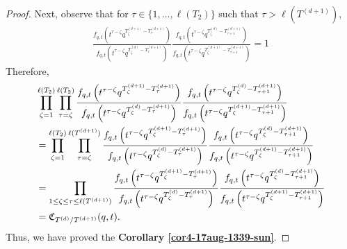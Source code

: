 \documentclass[12pt,reqno,a4paper]{amsart}
\newcommand{\fraks}[1]{\mathfrak{#1}}
\numberwithin{equation}{section}
\theoremstyle{definition}
\begin{document}
\begin{proof}
Next, observe that for $\tau \in \{1,\dots,\ell(T_2)\}$ such that $\tau > \ell(T^{(d+1)})$, 
\footnotesize
\begin{align}
	\frac{
		f_{q,t}\left(	t^{\tau - \zeta} q^{ T^{(d+1)}_{\zeta} 	- T^{(d+1)}_{\tau}	 		}						\right)
	}{
		f_{q,t}\left(	t^{\tau - \zeta} q^{ T^{(d)}_{\zeta} 	- T^{(d+1)}_{\tau}		}						\right)
	}
	\frac{
		f_{q,t}\left(		
		t^{\tau - \zeta} q^{ T^{(d)}_{\zeta} 	- T^{(d+1)}_{\tau + 1} 		}					\right)
	}{
		f_{q,t}\left(		
		t^{\tau- \zeta} q^{ T^{(d+1)}_{\zeta} 	- T^{(d+1)}_{\tau + 1}			}					\right)
	} 
	= 1
\end{align}
\normalsize
Therefore, 
\footnotesize
\begin{align}
	&\prod_{\zeta = 1}^{\ell(T_2)}
	\prod_{\tau = \zeta}^{\ell(T_2)}
	\frac{
		f_{q,t}\left(	t^{\tau - \zeta} q^{ T^{(d+1)}_{\zeta} 	- T^{(d+1)}_{\tau}	 		}						\right)
	}{
		f_{q,t}\left(	t^{\tau - \zeta} q^{ T^{(d)}_{\zeta} 	- T^{(d+1)}_{\tau}		}						\right)
	}
	\frac{
		f_{q,t}\left(		
		t^{\tau - \zeta} q^{ T^{(d)}_{\zeta} 	- T^{(d+1)}_{\tau + 1} 		}					\right)
	}{
		f_{q,t}\left(		
		t^{\tau- \zeta} q^{ T^{(d+1)}_{\zeta} 	- T^{(d+1)}_{\tau + 1}			}					\right)
	}
	\\ 
	&= 
	\prod_{\zeta = 1}^{\ell(T_2)}
	\prod_{\tau = \zeta}^{\ell(T^{(d+1)})}
	\frac{
		f_{q,t}\left(	t^{\tau - \zeta} q^{ T^{(d+1)}_{\zeta} 	- T^{(d+1)}_{\tau}	 		}						\right)
	}{
		f_{q,t}\left(	t^{\tau - \zeta} q^{ T^{(d)}_{\zeta} 	- T^{(d+1)}_{\tau}		}						\right)
	}
	\frac{
		f_{q,t}\left(		
		t^{\tau - \zeta} q^{ T^{(d)}_{\zeta} 	- T^{(d+1)}_{\tau + 1} 		}					\right)
	}{
		f_{q,t}\left(		
		t^{\tau- \zeta} q^{ T^{(d+1)}_{\zeta} 	- T^{(d+1)}_{\tau + 1}			}					\right)
	} 
	\notag 
	\\
	&= 
	\prod_{1 \leq \zeta \leq \tau \leq \ell(T^{(d+1)})}
	\frac{
		f_{q,t}\left(	t^{\tau - \zeta} q^{ T^{(d+1)}_{\zeta} 	- T^{(d+1)}_{\tau}	 		}						\right)
	}{
		f_{q,t}\left(	t^{\tau - \zeta} q^{ T^{(d)}_{\zeta} 	- T^{(d+1)}_{\tau}		}						\right)
	}
	\frac{
		f_{q,t}\left(		
		t^{\tau - \zeta} q^{ T^{(d)}_{\zeta} 	- T^{(d+1)}_{\tau + 1} 		}					\right)
	}{
		f_{q,t}\left(		
		t^{\tau- \zeta} q^{ T^{(d+1)}_{\zeta} 	- T^{(d+1)}_{\tau + 1}			}					\right)
	} 
	\notag 
	\\
	&= \fraks{C}_{T^{(d)}/T^{(d+1)}}(q,t).
	\notag 
\end{align}
\normalsize
Thus, we have proved the \textbf{Corollary \ref{cor4-17aug-1339-sun}}. 
\end{proof}
\end{document}
